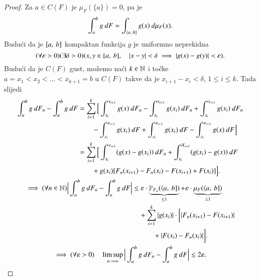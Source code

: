 \begin{proof}
    Za $a \in C(F)$ je $\mu_F (\{ a \}) = 0$, pa je
    \begin{equation*}
        \int_a^b g \: dF = \int_{\langle {a}, \: {b}]} g(x) \: d \mu_F (x).
    \end{equation*}
    Budu\' ci da je $[{a}, \:{b}]$ kompaktan funkcija $g$ je uniformno neprekidna
    \begin{equation*}
        (\forall \varepsilon > 0) (\exists \delta > 0) (x, y \in [{a}, \:{b}], \quad |x - y| < \delta \implies |g(x) - g(y)| < \varepsilon).
    \end{equation*}
    Budu\' ci da je $C(F)$ gust, mo\v zemo na\' ci $k \in \mathbb{N}$ i to\v cke $a = x_1 < x_2 < \ldots < x_{k + 1} = b$ u $C(F)$ takve da je $x_{i + 1} - x_i < \delta$, $1 \leq i \leq k$.
    Tada slijedi
    \begin{equation*}
        \begin{gathered}
            \begin{aligned}
                \int_a^b g \: d F_n - \int_a^b g \: d F &= \sum\limits_{i = 1}^{k} \Big[ \int_{x_i}^{x_{i+1}} g(x) \: d F_n - \int_{x_i}^{x_{i + 1}} g(x_i) \: d F_n + \int_{x_i}^{x_{i+1}} g(x_i) \: d F_n\\
                &\quad \quad- \int_{x_i}^{x_{i + 1}} g(x_i) \: d F + \int_{x_i}^{x_{i + 1}} g(x_i) \: d F - \int_{x_i}^{x_{i + 1}} g(x) \: d F \Big]\\
                &= \sum\limits_{i = 1}^{k} \Big[ \int_{x_i}^{x_{i + 1}} (g (x) - g(x_i)) \: d F_n + \int_{x_i}^{X_{i + 1}} (g(x_i) - g(x)) \: d F\\
                &\quad \quad+ g(x_i) [ F_n (x_{i + 1}) - F_n (x_i) - F (x_{i + 1}) + F(x_i) ] \Big].
            \end{aligned}\\
            \begin{aligned}
                \implies (\forall n \in \mathbb{N}) \Big| \int_a^b g \: d F_n - \int_a^b g \: d F \Big| &\leq \varepsilon \cdot \underbrace{\mathbb{P}_{F_n} (\langle {a}, \: {b}])}_{\leq 1} + \varepsilon \cdot \underbrace{\mu_{F} (\langle {a}, \: {b}])}_{\leq 1}\\
                &\quad + \sum\limits_{i = 1}^{k} | g(x_i) | \cdot \bigg[| F_n (x_{i + 1}) - F (x_{i + 1}) |\\
                &\quad \quad \quad+ | F(x_i) - F_n (x_i) | \bigg].
            \end{aligned}\\
            \implies (\forall \varepsilon > 0) \quad \limsup\limits_{n \to \infty} \Big| \int_a^b g \: d F_n - \int_a^b g \: d F \Big| \leq 2 \varepsilon.
        \end{gathered}
    \end{equation*}
\end{proof}

